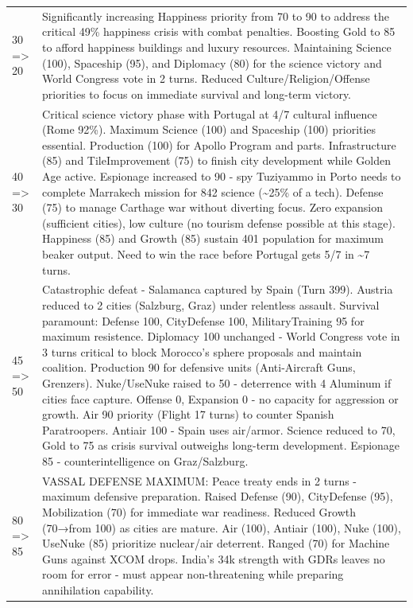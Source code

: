 \begin{longtable}{p{}p{}}
30 => 20 & Significantly increasing Happiness priority from 70 to 90 to address the critical 49\% happiness crisis with combat penalties. Boosting Gold to 85 to afford happiness buildings and luxury resources. Maintaining Science (100), Spaceship (95), and Diplomacy (80) for the science victory and World Congress vote in 2 turns. Reduced Culture/Religion/Offense priorities to focus on immediate survival and long-term victory. \\
40 => 30 & Critical science victory phase with Portugal at 4/7 cultural influence (Rome 92\%). Maximum Science (100) and Spaceship (100) priorities essential. Production (100) for Apollo Program and parts. Infrastructure (85) and TileImprovement (75) to finish city development while Golden Age active. Espionage increased to 90 - spy Tuziyammo in Porto needs to complete Marrakech mission for 842 science (\textasciitilde 25\% of a tech). Defense (75) to manage Carthage war without diverting focus. Zero expansion (sufficient cities), low culture (no tourism defense possible at this stage). Happiness (85) and Growth (85) sustain 401 population for maximum beaker output. Need to win the race before Portugal gets 5/7 in \textasciitilde 7 turns. \\
45 => 50 & Catastrophic defeat - Salamanca captured by Spain (Turn 399). Austria reduced to 2 cities (Salzburg, Graz) under relentless assault. Survival paramount: Defense 100, CityDefense 100, MilitaryTraining 95 for maximum resistence. Diplomacy 100 unchanged - World Congress vote in 3 turns critical to block Morocco's sphere proposals and maintain coalition. Production 90 for defensive units (Anti-Aircraft Guns, Grenzers). Nuke/UseNuke raised to 50 - deterrence with 4 Aluminum if cities face capture. Offense 0, Expansion 0 - no capacity for aggression or growth. Air 90 priority (Flight 17 turns) to counter Spanish Paratroopers. Antiair 100 - Spain uses air/armor. Science reduced to 70, Gold to 75 as crisis survival outweighs long-term development. Espionage 85 - counterintelligence on Graz/Salzburg. \\
80 => 85 & VASSAL DEFENSE MAXIMUM: Peace treaty ends in 2 turns - maximum defensive preparation. Raised Defense (90), CityDefense (95), Mobilization (70) for immediate war readiness. Reduced Growth (70→from 100) as cities are mature. Air (100), Antiair (100), Nuke (100), UseNuke (85) prioritize nuclear/air deterrent. Ranged (70) for Machine Guns against XCOM drops. India's 34k strength with GDRs leaves no room for error - must appear non-threatening while preparing annihilation capability. \\

\end{longtable}
